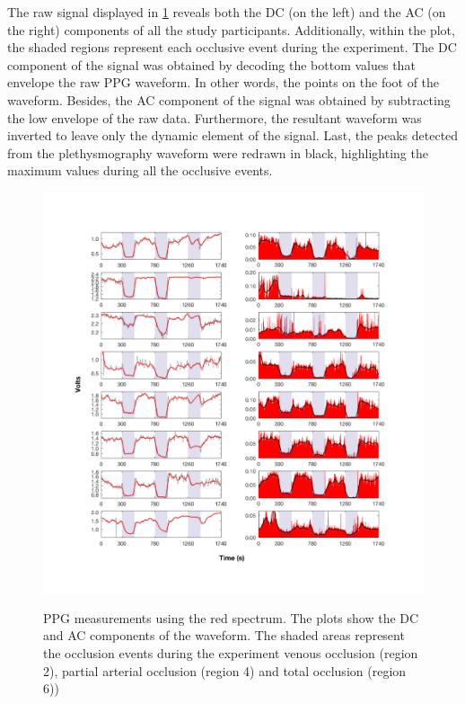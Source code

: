 The raw signal displayed in \ref{fig:RED PPG} reveals both the DC (on the left) and the AC (on the right) components of all the study participants. Additionally, within the plot, the shaded regions represent each occlusive event during the experiment. The DC component of the signal was obtained by decoding the bottom values that envelope the raw PPG waveform. In other words, the points on the foot of the waveform.  Besides, the AC component of the signal was obtained by subtracting the low envelope of the raw data. Furthermore, the resultant waveform was inverted to leave only the dynamic element of the signal. Last, the peaks detected from the plethysmography waveform were redrawn in black, highlighting the maximum values during all the occlusive events.

\begin{figure}[!htbp]
	\centering
	\includegraphics[width=\textwidth,keepaspectratio,trim={1cm 0cm 0cm 0 cm},clip]{figure_cmp_4}
	\centering
	\begin{minipage}[t]{.45\linewidth}
		\centering
		\label{fig:RED PPG AC}
	\end{minipage}%
	\centering
	\begin{minipage}[t]{.45\linewidth}
		\centering
		\label{fig:RED PPG DC}
	\end{minipage}
	\caption[PPG red wavelength measurments, AC and DC components]{PPG measurements using the red spectrum. The plots show the DC and AC components of the waveform. The shaded areas represent the occlusion events during the experiment venous occlusion (region 2), partial arterial occlusion (region 4) and total occlusion (region 6))}
	\label{fig:RED PPG}
\end{figure}

